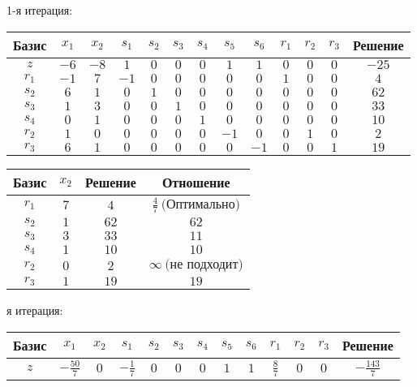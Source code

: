\documentclass{article}%
\begin{document}
\begin{flushleft}%
1{-}я итерация: %
\newline%
\newline%
\renewcommand{\arraystretch}{1.3}%
\begin{tabular}{|c|ccccccccccc|c|}%
\hline%
Базис&$x_{1}$&$x_{2}$&$s_{1}$&$s_{2}$&$s_{3}$&$s_{4}$&$s_{5}$&$s_{6}$&$r_{1}$&$r_{2}$&$r_{3}$&Решение\\%
\hline%
$z$&$-6$&$-8$&$1$&$0$&$0$&$0$&$1$&$1$&$0$&$0$&$0$&$-25$\\%
\hline%
$r_{1}$&$-1$&$7$&$-1$&$0$&$0$&$0$&$0$&$0$&$1$&$0$&$0$&$4$\\%
$s_{2}$&$6$&$1$&$0$&$1$&$0$&$0$&$0$&$0$&$0$&$0$&$0$&$62$\\%
$s_{3}$&$1$&$3$&$0$&$0$&$1$&$0$&$0$&$0$&$0$&$0$&$0$&$33$\\%
$s_{4}$&$0$&$1$&$0$&$0$&$0$&$1$&$0$&$0$&$0$&$0$&$0$&$10$\\%
$r_{2}$&$1$&$0$&$0$&$0$&$0$&$0$&$-1$&$0$&$0$&$1$&$0$&$2$\\%
$r_{3}$&$6$&$1$&$0$&$0$&$0$&$0$&$0$&$-1$&$0$&$0$&$1$&$19$\\%
\hline%
\end{tabular}%
\newline%
\newline%
\newline%
\begin{tabular}{|cccc|}%
\hline%
Базис&$x_{2}$&Решение&Отношение\\%
\hline%
$r_{1}$&$7$&$4$&$\frac{4}{7}\: \text{(Оптимально)}$\\%
$s_{2}$&$1$&$62$&$62$\\%
$s_{3}$&$3$&$33$&$11$\\%
$s_{4}$&$1$&$10$&$10$\\%
$r_{2}$&$0$&$2$&$\infty \: \text{(не подходит)}$\\%
$r_{3}$&$1$&$19$&$19$\\%
\hline%
\end{tabular}%
\newline%
\newline%
я итерация: %
\newline%
\newline%
\renewcommand{\arraystretch}{1.3}%
\begin{tabular}{|c|ccccccccccc|c|}%
\hline%
Базис&$x_{1}$&$x_{2}$&$s_{1}$&$s_{2}$&$s_{3}$&$s_{4}$&$s_{5}$&$s_{6}$&$r_{1}$&$r_{2}$&$r_{3}$&Решение\\%
\hline%
$z$&$-\frac{50}{7}$&$0$&$-\frac{1}{7}$&$0$&$0$&$0$&$1$&$1$&$\frac{8}{7}$&$0$&$0$&$-\frac{143}{7}$\\%

\end{tabular}
\end{flushleft}
\end{document}
